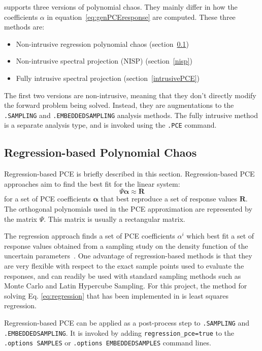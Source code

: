 \Xyce{} supports three versions of polynomial chaos.  They mainly differ in how the coefficients $\alpha$ in equation~\ref{eq:genPCEresponse} are computed.  These three methods are:
\begin{itemize}
  \item Non-intrusive regression polynomial chaos (section~\ref{regressionPCE})
  \item Non-intrusive spectral projection  (NISP) (section~\ref{nisp})
  \item Fully intrusive spectral projection (section~\ref{intrusivePCE})
\end{itemize}
The first two versions are non-intrusive, meaning that they don't directly modify the forward problem being solved.  
Instead, they are augmentations to the \texttt{.SAMPLING} and \texttt{.EMBEDDEDSAMPLING} analysis methods.
The fully intrusive method is a separate analysis type, and is invoked using the \texttt{.PCE} command.
\clearpage
\subsection{Regression-based Polynomial Chaos}
\label{regressionPCE}

Regression-based PCE is briefly described in this section.
Regression-based PCE approaches aim to find the best fit for the linear system:
\begin{equation}
\boldsymbol{\varPsi} \boldsymbol{\alpha} \approx \boldsymbol{R} \label{eq:regression}
\end{equation}
for a set of PCE coefficients $\boldsymbol{\alpha}$ that best
reproduce a set of response values $\boldsymbol{R}$.   The orthogonal polynomials used in the  
PCE approximation are represented by the matrix $\varPsi$.  This matrix is usually a rectangular
matrix.

The regression approach finds a set of PCE coefficients $\alpha^i$ which best fit a set of response
values obtained from a sampling study on the density function of the uncertain 
parameters~\cite{pt_colloc1}.  One advantage of regression-based methods is that
they are very flexible with respect to the exact sample points used to evaluate the responses, 
and can readily be used with standard sampling methods such as Monte Carlo and Latin Hypercube Sampling.
For this project, the method for solving Eq. \eqref{eq:regression} that has been implemented 
in \Xyce{} is least squares regression.

Regression-based PCE can be applied as a post-process step 
to \texttt{.SAMPLING} and \texttt{.EMBEDDEDSAMPLING}.  It is invoked by adding 
\texttt{regression\_pce=true} to the \texttt{.options SAMPLES} 
or \texttt{.options EMBEDDEDSAMPLES} command lines.  

